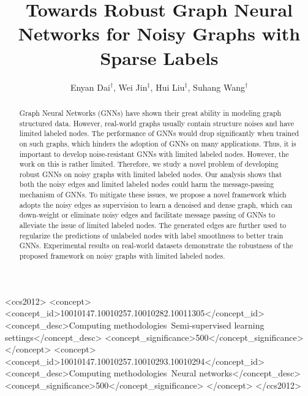 \documentclass[sigconf]{acmart}
\title{Towards Robust Graph Neural Networks for Noisy Graphs with Sparse Labels}
\author{Enyan Dai$^\dagger$, Wei Jin$^\ddagger$, Hui Liu$^\ddagger$, Suhang Wang$^\dagger$ }
\affiliation{$\dagger$ The Pennsylvania State University,
{${\ddagger}$} Michigan State University%
}
\begin{document}
\fancyhead{}
\begin{abstract}
Graph Neural Networks (GNNs) have shown their great ability in modeling graph structured data. However, real-world graphs usually contain structure noises and have limited labeled nodes. The performance of GNNs would drop significantly when trained on such graphs, which hinders the adoption of GNNs on many applications. Thus, it is important to develop noise-resistant GNNs with limited labeled nodes. However, the work on this is rather limited. Therefore, we study a novel problem of developing robust GNNs on noisy graphs with limited labeled nodes. Our analysis shows that both the noisy edges and limited labeled nodes could harm the message-passing mechanism of GNNs. To mitigate these issues, we propose a novel framework which adopts the noisy edges as supervision to learn a denoised and dense graph, which can down-weight or eliminate noisy edges and facilitate message passing of GNNs to alleviate the issue of limited labeled nodes. The generated edges are further used to 
regularize the predictions of unlabeled nodes with label smoothness to better train GNNs. Experimental results on real-world datasets demonstrate the robustness of the proposed framework on noisy graphs with limited labeled nodes. 




\end{abstract}


\begin{CCSXML}
<ccs2012>
<concept>
<concept_id>10010147.10010257.10010282.10011305</concept_id>
<concept_desc>Computing methodologies~Semi-supervised learning settings</concept_desc>
<concept_significance>500</concept_significance>
</concept>
<concept>
<concept_id>10010147.10010257.10010293.10010294</concept_id>
<concept_desc>Computing methodologies~Neural networks</concept_desc>
<concept_significance>500</concept_significance>
</concept>
</ccs2012>
\end{CCSXML}


\maketitle














\newpage

\end{document}
